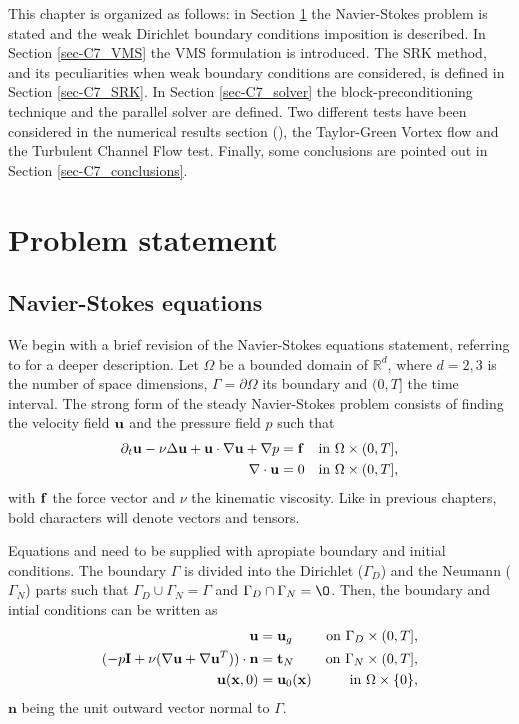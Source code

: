 This chapter is organized as follows: in Section \ref{sec:C7_prob_statment} the Navier-Stokes problem is stated and the weak Dirichlet boundary conditions imposition is described. In Section \ref{sec-C7_VMS} the VMS formulation is introduced. The SRK method, and its peculiarities when weak boundary conditions are considered, is defined in Section \ref{sec-C7_SRK}. In Section \ref{sec-C7_solver} the block-preconditioning technique and the parallel solver are defined. Two different tests have been considered in the numerical results section (), the Taylor-Green Vortex flow and the Turbulent Channel Flow test. Finally, some conclusions are pointed out in Section \ref{sec-C7_conclusions}.

\section{Problem statement}
\label{sec:C7_prob_statment}
\subsection{Navier-Stokes equations}
\label{subsec:C7_NS_eq}
We begin with a brief revision of the Navier-Stokes equations statement, referring to  for a deeper description. Let $\Omega$ be a bounded domain of $\mathbb{R}^d$, where $d=2,3$ is the number of space dimensions, $\Gamma=\partial\Omega$ its boundary and $(0,T]$ the time interval. The strong form of the steady Navier-Stokes problem consists of finding the velocity field ${\bf u}$ and the pressure field $p$ such that 
\begin{align}
\label{eq-C7_NS_strong_mome}
\partial_t{\bf u}-\nu\Delta{\bf u}+{\bf u}\cdot\nabla{\bf u}+\nabla p&={\bf f}&\mbox{in $\Omega\times(0,T]$,}\\
\label{eq-C7_NS_strong_inc}
\nabla\cdot{\bf u}&=0&\mbox{in $\Omega\times(0,T]$,}
\end{align}
with ${\bf f}$ the force vector and $\nu$ the kinematic viscosity. Like in previous chapters, bold characters will denote vectors and tensors.

Equations  and  need to be supplied with apropiate boundary and initial conditions. The boundary $\Gamma$ is divided into the Dirichlet ($\Gamma_D$) and the Neumann ($\Gamma_N$) parts such that $\Gamma_D\cup\Gamma_N=\Gamma$ and $\Gamma_D\cap\Gamma_N=\O$. Then, the boundary and intial conditions can be written as
\begin{align}
\label{eq-C7_NS_strong_Dir}
{\bf u}&={\bf u}_g&\mbox{on $\Gamma_D\times(0,T]$,}\\
\label{eq-C7_NS_strong_Neu}
(-p\mathbf{I}+\nu(\nabla{\bf u}+\nabla{\bf u}^T))\cdot\mathbf{n}&=\mathbf{t}_N&\mbox{on $\Gamma_N\times(0,T]$,}\\
\label{eq-C7_NS_strong_Ini}
{\bf u}({\bf x},0)&={\bf u}_0({\bf x})&\mbox{in $\Omega\times\{0\}$,}
\end{align}
$\mathbf{n}$ being the unit outward vector normal to $\Gamma$.

